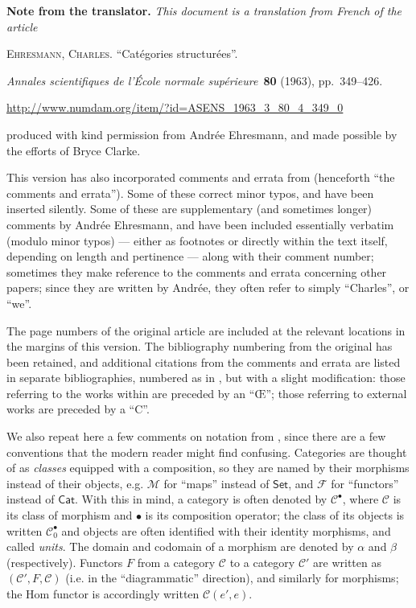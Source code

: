 \documentclass[a4paper,fleqn]{article}
\title{\sc{Structured categories}}
\author{Charles Ehresmann}
\date{1963}
\newcommand{\origcit}{%
  \textsc{Ehresmann, Charles.}
  ``Catégories structurées''.
  \par\emph{Annales scientifiques de l'École normale supérieure}~\textbf{80} (1963), pp.~349--426.
  \par\url{http://www.numdam.org/item/?id=ASENS_1963_3_80_4_349_0}
}
\newenvironment{translator}[1]
  {\phantomsection\par\medskip\noindent\small\textbf{#1.}\itshape}
  {\par\medskip}
\theoremstyle{plain}
\theoremstyle{definition}
\newcommand{\CC}{\mathcal{C}}
\newcommand{\MM}{\mathcal{M}}
\newcommand{\FF}{\mathcal{F}}
\newcommand{\smallbullet}{\bullet}
\begin{document}
\maketitle

  \begin{translator}{Note from the translator}
    This document is a translation from French of the article

    \medskip
    {\normalfont\origcit}

    \medskip
    {\noindent}produced with kind permission from Andrée Ehresmann, and made possible by the efforts of Bryce Clarke.

    \medskip

    This version has also incorporated comments and errata from \cite[Comments on Part III-1, p.~342--363]{coll} (henceforth ``the comments and errata'').
    Some of these correct minor typos, and have been inserted silently.
    Some of these are supplementary (and sometimes longer) comments by Andrée Ehresmann, and have been included essentially verbatim (modulo minor typos) --- either as footnotes or directly within the text itself, depending on length and pertinence --- along with their comment number;
    sometimes they make reference to the comments and errata concerning other papers;
    since they are written by Andrée, they often refer to simply ``Charles'', or ``we''.

    The page numbers of the original article are included at the relevant locations in the margins of this version.
    The bibliography numbering from the original has been retained, and additional citations from the comments and errata are listed in separate bibliographies, numbered as in \cite{coll}, but with a slight modification: those referring to the works within \cite{coll} are preceded by an ``Œ''; those referring to external works are preceded by a ``C''.

    \medskip

    We also repeat here a few comments on notation from \cite[Comments on Part III-1, p.~337--338]{coll}, since there are a few conventions that the modern reader might find confusing.
    Categories are thought of as \emph{classes} equipped with a composition, so they are named by their morphisms instead of their objects, e.g. $\MM$ for ``maps'' instead of $\mathsf{Set}$, and $\FF$ for ``functors'' instead of $\mathsf{Cat}$.
    With this in mind, a category is often denoted by $\CC^{\smallbullet}$, where $\CC$ is its class of morphism and $\smallbullet$ is its composition operator; the class of its objects is written $\CC_0^\smallbullet$ and objects are often identified with their identity morphisms, and called \emph{units}.
    The domain and codomain of a morphism are denoted by $\alpha$ and $\beta$ (respectively).
    Functors $F$ from a category $\CC$ to a category $\CC'$ are written as $(\CC',F,\CC)$ (i.e. in the ``diagrammatic'' direction), and similarly for morphisms; the Hom functor is accordingly written $\CC(e',e)$.


\end{translator}
\end{document}

